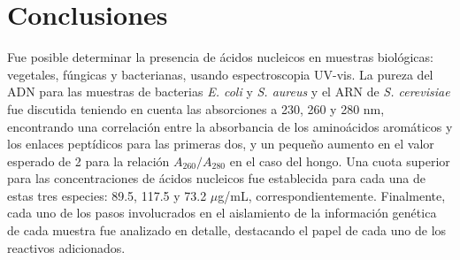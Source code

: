 \documentclass[fleqn,10pt]{SelfArx}
\begin{document}
\section{Conclusiones}
	Fue posible determinar la presencia de ácidos nucleicos en muestras biológicas: vegetales, fúngicas y bacterianas, usando espectroscopia UV-vis. La pureza del ADN para las muestras de bacterias \textit{E. coli} y \textit{S. aureus} y el ARN de	\textit{S. cerevisiae} fue discutida teniendo en cuenta las absorciones a 230, 260 y 280 nm, encontrando una correlación entre la absorbancia de los aminoácidos aromáticos y los enlaces peptídicos para las primeras dos, y un pequeño aumento en el valor esperado de 2 para la relación $A_{260} / A_{280}$ en el caso del hongo. Una cuota superior para las concentraciones de ácidos nucleicos fue establecida para cada una de estas tres especies: 89.5, 117.5 y 73.2 $\mu$g/mL, correspondientemente. Finalmente, cada uno de los pasos involucrados en el aislamiento de la información genética de cada muestra fue analizado en detalle, destacando el papel de cada uno de los reactivos adicionados.
	



\end{document}
